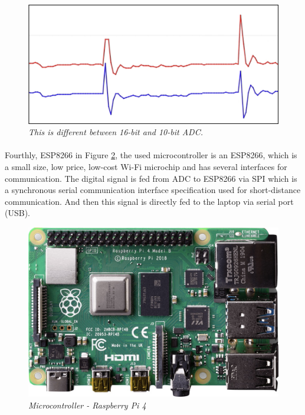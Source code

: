 \begin{figure}[H]
  \centering
  \caption[This is different between 16-bit and 10-bit ADC.]{\emph{This is different between 16-bit and 10-bit ADC. }}\label{fig:adc}
  \includegraphics[scale = 0.3]{figures/ADC.jpg}  
\end{figure}

\paragraph{}
Fourthly, ESP8266 in Figure \ref{fig:pi4}, the used microcontroller is an ESP8266, which is a small size, low price, low-cost Wi-Fi microchip and has several interfaces for communication. The digital signal is fed from ADC to ESP8266 via SPI which is a synchronous serial communication interface specification used for short-distance communication. And then this signal is directly fed to the laptop via serial port (USB).

\begin{figure}[H]
  \centering
  \caption[Microcontroller - Raspberry Pi 4]{\emph{Microcontroller - Raspberry Pi 4 }}\label{fig:pi4}
  \includegraphics[scale = 0.3]{figures/pi4.jpg}  
\end{figure}
